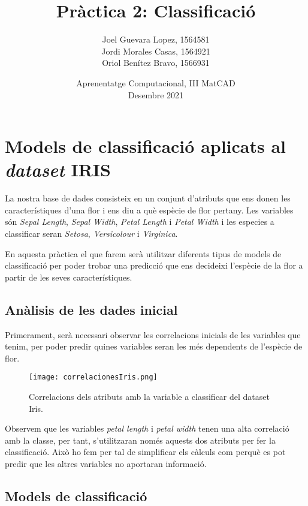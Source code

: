 \documentclass[a4paper, 11pt]{article}
\title{\Huge{\textbf{Pràctica 2: Classificació}}}
\author{\Large{Joel Guevara Lopez, 1564581}
        \\\Large{Jordi Morales Casas, 1564921}
        \\\Large{Oriol Benítez Bravo, 1566931}}
\date{Aprenentatge Computacional, III MatCAD\\ \vspace{6pt} Desembre 2021}
\begin{document}
    \maketitle
    \tableofcontents
    \newpage

    \section{Models de classificació aplicats al \textit{dataset} IRIS}

    La nostra base de dades consisteix en un conjunt d'atributs que ens donen les característiques
    d'una flor i ens diu a què espècie de flor pertany. Les variables són \textit{Sepal Length},
    \textit{Sepal Width}, \textit{Petal Length} i \textit{Petal Width} i les especies a classificar
    seran \textit{Setosa}, \textit{Versicolour} i \textit{Virginica}.

    En aquesta pràctica el que farem serà utilitzar diferents tipus de models de classificació per
    poder trobar una predicció que ens decideixi l'espècie de la flor a partir de les seves
    característiques.

    \newpage
    \subsection{Anàlisis de les dades inicial}

    Primerament, serà necessari observar les correlacions inicials de les variables que tenim, per poder predir quines variables seran les més dependents de l'espècie de flor.

    \begin{figure}[H]
        \centering
        \texttt{[image: correlacionesIris.png]}
        \caption{Correlacions dels atributs amb la variable a classificar del dataset Iris.}
    \end{figure}

    Observem que les variables \textit{petal length} i \textit{petal width} tenen una alta correlació amb la classe, per tant, s'utilitzaran només aquests dos atributs per fer la classificació. Això ho fem per tal de simplificar els càlculs com perquè es pot predir que les altres variables no aportaran informació.

    \newpage
    \subsection{Models de classificació}
\end{document}
